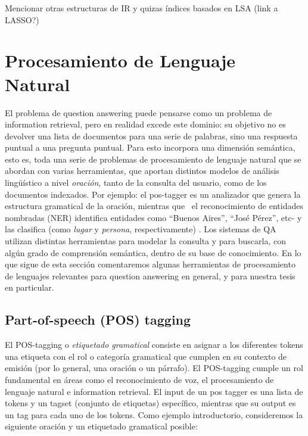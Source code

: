 {\color{red} Mencionar otras estructuras de IR y quizas índices basados en LSA (link a LASSO?)}



\section{Procesamiento de Lenguaje Natural}


El problema de question answering puede pensarse como un problema de information
retrieval, pero en realidad excede este dominio: su objetivo no es devolver una lista de documentos para
una serie de palabras, sino una respuesta puntual a una pregunta
puntual. Para esto incorpora una dimensión semántica, esto es, toda
una serie de problemas de procesamiento de lenguaje natural que se
abordan con varias herramientas, que aportan distintos modelos de
análisis lingüístico a nivel \textit{oración}, tanto de la
consulta del usuario, como de los documentos indexados. Por ejemplo: el
pos-tagger es un analizador que genera la estructura gramatical de la
oración, mientras que \ el reconocimiento de entidades nombradas
(NER) identifica entidades como {\textquotedblleft}Buenos
Aires{\textquotedblright}, {\textquotedblleft}José
Pérez{\textquotedblright}, etc- y las clasifica (como \textit{lugar}
y \textit{persona}, respectivamente) . Los sistemas de QA utilizan
distintas herramientas para modelar la consulta y para buscarla, con
algún grado de comprensión semántica, dentro de su base de
conocimiento.
En lo que sigue de esta sección comentaremos algunas herramientas de procesamiento de lenguajes relevantes para question answering en general, y para nuestra tesis en particular.

\subsection{Part-of-speech (POS) tagging}
\label{subsec:pos}
El POS-tagging o \textit{etiquetado gramatical} consiste en asignar a los diferentes 
tokens una etiqueta con el rol o categoría gramatical que cumplen en su contexto de emisión (por lo general, una oración o un párrafo). 
El POS-tagging cumple un rol fundamental en áreas como el reconocimiento de voz, el procesamiento de lenguaje natural e information retrieval.
El input de un pos tagger es una lista de tokens y un tagset (conjunto de etiquetas) específico, mientras que su output es un tag para cada uno 
de los tokens. Como ejemplo introductorio, consideremos la siguiente oración y un etiquetado gramatical posible:

